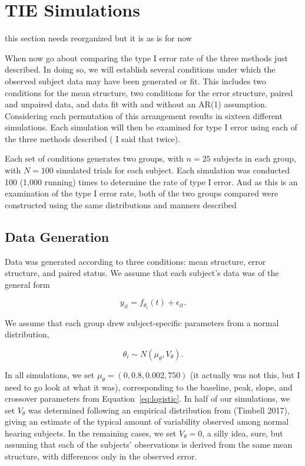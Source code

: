 \documentclass{article}
\begin{document}
\section{TIE Simulations}

this section needs reorganized but it is as is for now

When now go about comparing the type I error rate of the three methods just described. In doing so, we will establish several conditions under which the observed subject data may have been generated or fit. This includes two conditions for the mean structure, two conditions for the error structure, paired and unpaired data, and data fit with and without an AR(1) assumption. Considering each permutation of this arrangement results in sixteen different simulations. Each simulation will then be examined for type I error using each of the three methods described ( I said that twice). 

Each set of conditions generates two groups, with $n = 25$ subjects in each group, with $N = 100$ simulated trials for each subject. Each simulation was conducted 100 (1,000 running) times to determine the rate of type I error. And as this is an examination of the type I error rate, both of the two groups compared were constructed using the same distributions and manners described


\subsection{Data Generation}

Data was generated according to three conditions: mean structure, error structure, and paired status. We assume that each subject's data was of the general form 

\begin{equation}\label{eq:sm_f_general}
y_{it} = f_{\theta_i}(t) + \epsilon_{it}.
\end{equation}

We assume that each group drew subject-specific parameters from a normal distribution, 

\begin{equation}
\theta_i \sim N(\mu_{\theta}, V_{\theta}).
\end{equation}

In all simulations, we set $\mu_{\theta} = (0,0.8, 0.002, 750)$ (it actually was not this, but I need to go look at what it was), corresponding to the baseline, peak, slope, and crossover parameters from Equation~\ref{eq:logistic}. In half of our simulations, we set $V_{\theta}$ was determined following an empirical distribution from (Timbell 2017), giving an estimate of the typical amount of variability observed among normal hearing subjects. In the remaining cases, we set $V_{\theta} = 0$, a silly idea, sure, but assuming that each of the subjects' observations is derived from the same mean structure, with differences only in the observed error. 
\end{document}
